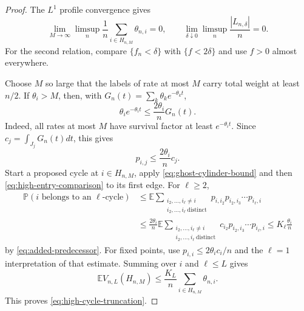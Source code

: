 \documentclass[11pt]{article}
\theoremstyle{remark}
\theoremstyle{plain}
\newcommand{\E}{\mathbb E}
\newcommand{\Pp}{\mathbb P}
\begin{document}
\begin{proof}
The $L^1$ profile convergence gives
\begin{equation}\label{eq:profile-tail-controls}
 \lim_{M\to\infty}\limsup_n\frac1n
 \sum_{i\in H_{n,M}}\theta_{n,i}=0,
 \qquad
 \lim_{\delta\downarrow0}\limsup_n\frac{|L_{n,\delta}|}{n}=0.
\end{equation}
For the second relation, compare $\{f_n<\delta\}$ with
$\{f<2\delta\}$ and use $f>0$ almost everywhere.

Choose $M$ so large that the labels of rate at most $M$ carry total weight at
least $n/2$.  If $\theta_i>M$, then, with
$G_n(t)=\sum_k\theta_k e^{-\theta_kt}$,
\[
 \theta_i e^{-\theta_i t}\le\frac{2\theta_i}{n}G_n(t).
\]
Indeed, all rates at most $M$ have survival factor at least
$e^{-\theta_i t}$.  Since $c_j=\int_{J_j}G_n(t)dt$, this gives
\begin{equation}\label{eq:high-entry-comparison}
 p_{i,j}\le\frac{2\theta_i}{n}c_j.
\end{equation}
Start a proposed cycle at $i\in H_{n,M}$, apply
\eqref{eq:ghost-cylinder-bound} and then
\eqref{eq:high-entry-comparison} to its first edge.  For $\ell\ge2$,
\begin{align*}
 \Pp(i\text{ belongs to an }\ell\text{-cycle})
 &\le \E\sum_{\substack{i_2,\ldots,i_\ell\ne i\\
                         i_2,\ldots,i_\ell\ {\mathrm{distinct}}}}
 p_{i,i_2}p_{i_2,i_3}\cdots p_{i_\ell,i}\\
 &\le \frac{2\theta_i}{n}\E
 \sum_{\substack{i_2,\ldots,i_\ell\ne i\\
                  i_2,\ldots,i_\ell\ {\mathrm{distinct}}}}
 c_{i_2}p_{i_2,i_3}\cdots p_{i_\ell,i}
 \le K_\ell\frac{\theta_i}{n}
\end{align*}
by \eqref{eq:added-predecessor}.  For fixed points, use
$p_{i,i}\le2\theta_i c_i/n$ and the $\ell=1$ interpretation of that estimate.
Summing over $i$ and $\ell\le L$ gives
\begin{equation}\label{eq:quantitative-high-cycles}
 \E V_{n,L}(H_{n,M})
 \le\frac{K_L}{n}\sum_{i\in H_{n,M}}\theta_{n,i}.
\end{equation}
This proves \eqref{eq:high-cycle-truncation}.


\end{proof}
\end{document}

